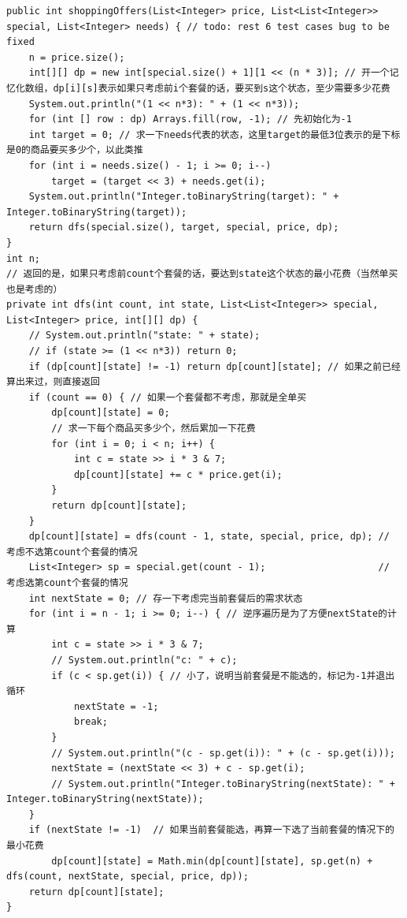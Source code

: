 \documentclass[9pt, b5paaper]{book}
\begin{document}
\begin{enumerate}
\begin{verbatim}
public int shoppingOffers(List<Integer> price, List<List<Integer>> special, List<Integer> needs) { // todo: rest 6 test cases bug to be fixed
    n = price.size();
    int[][] dp = new int[special.size() + 1][1 << (n * 3)]; // 开一个记忆化数组，dp[i][s]表示如果只考虑前i个套餐的话，要买到s这个状态，至少需要多少花费
    System.out.println("(1 << n*3): " + (1 << n*3));
    for (int [] row : dp) Arrays.fill(row, -1); // 先初始化为-1
    int target = 0; // 求一下needs代表的状态，这里target的最低3位表示的是下标是0的商品要买多少个，以此类推
    for (int i = needs.size() - 1; i >= 0; i--) 
        target = (target << 3) + needs.get(i);
    System.out.println("Integer.toBinaryString(target): " + Integer.toBinaryString(target));
    return dfs(special.size(), target, special, price, dp);
}
int n;
// 返回的是，如果只考虑前count个套餐的话，要达到state这个状态的最小花费（当然单买也是考虑的）
private int dfs(int count, int state, List<List<Integer>> special, List<Integer> price, int[][] dp) {
    // System.out.println("state: " + state);
    // if (state >= (1 << n*3)) return 0;
    if (dp[count][state] != -1) return dp[count][state]; // 如果之前已经算出来过，则直接返回
    if (count == 0) { // 如果一个套餐都不考虑，那就是全单买
        dp[count][state] = 0;
        // 求一下每个商品买多少个，然后累加一下花费
        for (int i = 0; i < n; i++) {
            int c = state >> i * 3 & 7;
            dp[count][state] += c * price.get(i);
        }
        return dp[count][state];
    }
    dp[count][state] = dfs(count - 1, state, special, price, dp); // 考虑不选第count个套餐的情况
    List<Integer> sp = special.get(count - 1);                    // 考虑选第count个套餐的情况
    int nextState = 0; // 存一下考虑完当前套餐后的需求状态
    for (int i = n - 1; i >= 0; i--) { // 逆序遍历是为了方便nextState的计算
        int c = state >> i * 3 & 7;
        // System.out.println("c: " + c);
        if (c < sp.get(i)) { // 小了，说明当前套餐是不能选的，标记为-1并退出循环
            nextState = -1;
            break;
        }
        // System.out.println("(c - sp.get(i)): " + (c - sp.get(i)));
        nextState = (nextState << 3) + c - sp.get(i);
        // System.out.println("Integer.toBinaryString(nextState): " + Integer.toBinaryString(nextState));
    }
    if (nextState != -1)  // 如果当前套餐能选，再算一下选了当前套餐的情况下的最小花费
        dp[count][state] = Math.min(dp[count][state], sp.get(n) + dfs(count, nextState, special, price, dp));
    return dp[count][state];
}
\end{verbatim}
\end{enumerate}
\end{document}
